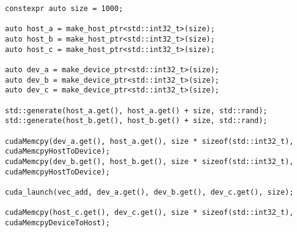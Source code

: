 \begin{lstlisting}
constexpr auto size = 1000;

auto host_a = make_host_ptr<std::int32_t>(size);
auto host_b = make_host_ptr<std::int32_t>(size);
auto host_c = make_host_ptr<std::int32_t>(size);

auto dev_a = make_device_ptr<std::int32_t>(size);
auto dev_b = make_device_ptr<std::int32_t>(size);
auto dev_c = make_device_ptr<std::int32_t>(size);

std::generate(host_a.get(), host_a.get() + size, std::rand);
std::generate(host_b.get(), host_b.get() + size, std::rand);

cudaMemcpy(dev_a.get(), host_a.get(), size * sizeof(std::int32_t), cudaMemcpyHostToDevice);
cudaMemcpy(dev_b.get(), host_b.get(), size * sizeof(std::int32_t), cudaMemcpyHostToDevice);

cuda_launch(vec_add, dev_a.get(), dev_b.get(), dev_c.get(), size);

cudaMemcpy(host_c.get(), dev_c.get(), size * sizeof(std::int32_t), cudaMemcpyDeviceToHost);
\end{lstlisting}